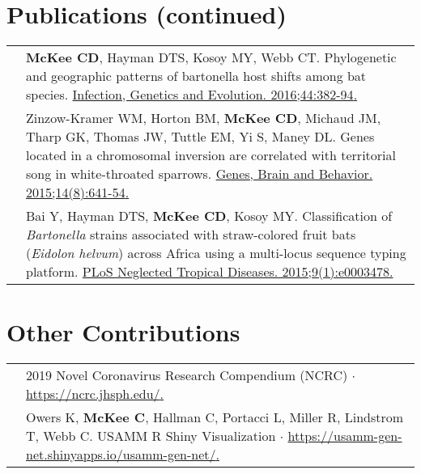 \documentclass[letterpaper]{deedy-resume} %
\begin{document}
\section{Publications (continued)}
\begin{tabular}{>{\raggedright\arraybackslash}p{2cm}p{16cm}}

2016 & \textbf{McKee CD}, Hayman DTS, Kosoy MY, Webb CT. Phylogenetic and geographic patterns of bartonella host shifts among bat species. \href{https://doi.org/10.1016/j.meegid.2016.07.033}{\textcolor{special}{Infection, Genetics and Evolution. 2016;44:382-94}.} \\

2015 & Zinzow-Kramer WM, Horton BM, \textbf{McKee CD}, Michaud JM, Tharp GK, Thomas JW, Tuttle EM, Yi S, Maney DL. Genes located in a chromosomal inversion are correlated with territorial song in white-throated sparrows. \href{https://doi.org/10.1111/gbb.12252}{\textcolor{special}{Genes, Brain and Behavior. 2015;14(8):641-54}.} \\

2015 & Bai Y, Hayman DTS, \textbf{McKee CD}, Kosoy MY. Classification of \textit{Bartonella} strains associated with straw-colored fruit bats (\textit{Eidolon helvum}) across Africa using a multi-locus sequence typing platform. \href{https://doi.org/10.1371/journal.pntd.0003478}{\textcolor{special}{PLoS Neglected Tropical Diseases. 2015;9(1):e0003478}.} \\

\end{tabular}
\sectionspace


\section{Other Contributions}
\begin{tabular}{>{\raggedright\arraybackslash}p{2cm}p{16cm}}
2021 & 2019 Novel Coronavirus Research Compendium (NCRC) $\cdot$ \href{https://ncrc.jhsph.edu/}{\textcolor{special}{https://ncrc.jhsph.edu/}.} \\

2015 & Owers K, \textbf{McKee C}, Hallman C, Portacci L, Miller R, Lindstrom T, Webb C. USAMM R Shiny Visualization $\cdot$ \href{https://usamm-gen-net.shinyapps.io/usamm-gen-net/}{\textcolor{special}{https://usamm-gen-net.shinyapps.io/usamm-gen-net/}.} \\
\end{tabular}
\sectionspace
\end{document}
